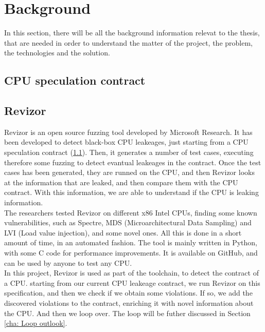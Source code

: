 \chapter{Background}
\label{cha:background}

In this section, there will be all the background information relevat to the thesis,
that are needed in order to understand the matter of the project, the problem,
the technologies and the solution.

\section{CPU speculation contract}
\label{cha:CPU speculation contract}

\section{Revizor}
\label{cha:Revizor} Revizor is an open source fuzzing tool developed by Microsoft
Research. It has been developed to detect black-box CPU leakeages, just starting
from a CPU speculation contract (\ref*{cha:CPU speculation contract}). Then, it generates
a number of test cases, executing therefore some fuzzing to detect evantual
leakeages in the contract. Once the test cases has been generated, they are
runned on the CPU, and then Revizor looks at the information that are leaked,
and then compare them with the CPU contract. With this information, we are able
to understand if the CPU is leaking information. \\

The researchers tested Revizor on different x86 Intel CPUs, finding some known vulnerabilities,
such as Spectre, MDS (Microarchitectural Data Sampling) and LVI (Load value
injection), and some novel ones. All this is done in a short amount of time, in
an automated fashion. The tool is mainly written in Python, with some C code for
performance improvements. It is available on GitHub, and can be used by anyone
to test any CPU. \\

In this project, Revizor is used as part of the toolchain, to detect the
contract of a CPU. starting from our current CPU leakeage contract, we run
Revizor on this specification, and then we check if we obtain some violations.
If so, we add the discovered violations to the contract, enriching it with novel
information about the CPU. And then we loop over. The loop will be futher
discussed in Section \ref*{cha: Loop outlook}. \\

